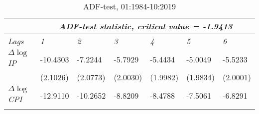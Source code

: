 \begin{table}[!htpb]
\centering
\caption{ADF-test,  01:1984-10:2019}
\label{tab:adf}
\begin{adjustbox}{max width=\textwidth}
\begin{tabular}{@{}lllllll@{}}
\toprule
                               & \multicolumn{6}{c}{\textit{ADF-test statistic, critical value = -1.9413}}                                                                                                                                                                                                                                                                                           \\ \midrule
\textit{Lags}                  & \textit{1}                                              & \textit{2}                                              & \textit{3}                                              & \textit{4}                                              & \textit{5}                                              & \textit{6}                                              \\ \cmidrule(l){2-7} 
$\Delta \log$\textit{IP} & \cellcolor[HTML]{9AFF99}-10.4303                        & \cellcolor[HTML]{9AFF99}-7.2244                         & \cellcolor[HTML]{9AFF99}-5.7929                         & \cellcolor[HTML]{9AFF99}-5.4434                         & \cellcolor[HTML]{9AFF99}-5.0049                         & \cellcolor[HTML]{9AFF99}-5.5233                         \\
                               & \cellcolor[HTML]{9AFF99}(2.1026)                        & \cellcolor[HTML]{9AFF99}(2.0773)                        & \cellcolor[HTML]{9AFF99}(2.0030)                        & \cellcolor[HTML]{9AFF99}(1.9982)                        & \cellcolor[HTML]{9AFF99}(1.9834)                        & \cellcolor[HTML]{9AFF99}(2.0001)                        \\ \cmidrule(l){2-7} 
$\Delta \log$\textit{CPI}             & \cellcolor[HTML]{9AFF99}-12.9110                        & \cellcolor[HTML]{9AFF99}-10.2652                        & \cellcolor[HTML]{9AFF99}-8.8209                         & \cellcolor[HTML]{9AFF99}-8.4788                         & \cellcolor[HTML]{9AFF99}-7.5061                         & \cellcolor[HTML]{9AFF99}-6.8291                         \\
                               & \cellcolor[HTML]{9AFF99}{\color[HTML]{000000} (1.9765)} & \cellcolor[HTML]{9AFF99}{\color[HTML]{000000} (2.0020)} & \cellcolor[HTML]{9AFF99}{\color[HTML]{000000} (1.9963)} & \cellcolor[HTML]{9AFF99}{\color[HTML]{000000} (1.9941)} & \cellcolor[HTML]{9AFF99}{\color[HTML]{000000} (2.0015)} & \cellcolor[HTML]{9AFF99}{\color[HTML]{000000} (1.9984)} \\ \cmidrule(l){2-7} 

\end{tabular}
\end{adjustbox}
\end{table}
